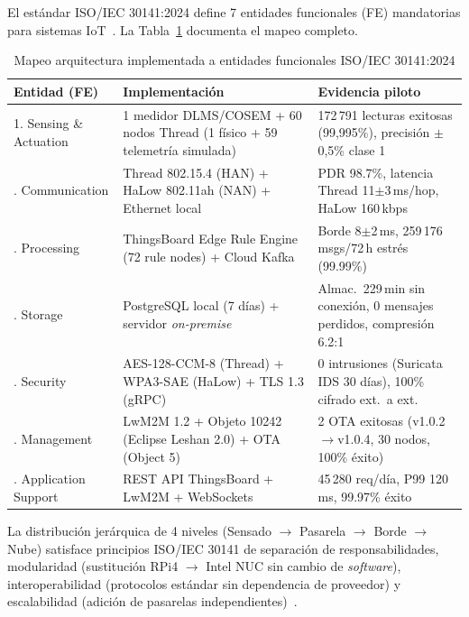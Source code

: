 El estándar ISO/IEC 30141:2024 define 7 entidades funcionales (FE) mandatorias para sistemas IoT~\cite{ISOIEC30141v2024,tangResearchInteroperabilityIoT}. La Tabla~\ref{tab:conformidad-iso30141} documenta el mapeo completo.

\begin{table}[H]
\centering
\caption{Mapeo arquitectura implementada a entidades funcionales ISO/IEC 30141:2024}
\label{tab:conformidad-iso30141}
\small
\begin{tabular}{@{}p{2.2cm}p{4.8cm}p{6.0cm}@{}}
\toprule
\textbf{Entidad (FE)} & \textbf{Implementación} & \textbf{Evidencia piloto} \\
\midrule
1. Sensing \& Actuation & 1 medidor DLMS/COSEM + 60 nodos Thread (1 físico + 59 telemetría simulada) & 172\,791 lecturas exitosas (99,995\%), precisión $\pm$0,5\% clase 1 \\
\addlinespace
2. Communication & Thread 802.15.4 (HAN) + HaLow 802.11ah (NAN) + Ethernet local~\cite{ThreadGroup1-4-0,IEEE802154-2020} & PDR 98.7\%, latencia Thread 11$\pm$3\,ms/hop, HaLow 160\,kbps \\
\addlinespace
3. Processing & ThingsBoard Edge Rule Engine (72 rule nodes) + Cloud Kafka & Borde 8$\pm$2\,ms, 259\,176 msgs/72\,h estrés (99.99\%) \\
\addlinespace
4. Storage & PostgreSQL local (7 días) + servidor \emph{on-premise} & Almac.\ 229\,min sin conexión, 0 mensajes perdidos, compresión 6.2:1 \\
\addlinespace
5. Security & AES-128-CCM-8 (Thread) + WPA3-SAE (HaLow) + TLS 1.3 (gRPC) & 0 intrusiones (Suricata IDS 30 días), 100\% cifrado ext.\ a ext.\ \\
\addlinespace
6. Management & LwM2M 1.2 + Objeto 10242 (Eclipse Leshan 2.0) + OTA (Object 5) & 2 OTA exitosas (v1.0.2$\rightarrow$v1.0.4, 30 nodos, 100\% éxito) \\
\addlinespace
7. Application Support & REST API ThingsBoard + LwM2M + WebSockets & 45\,280 req/día, P99 120\,ms, 99.97\% éxito \\
\bottomrule
\end{tabular}
\end{table}

La distribución jerárquica de 4 niveles (Sensado $\rightarrow$ Pasarela $\rightarrow$ Borde $\rightarrow$ Nube) satisface principios ISO/IEC 30141 de separación de responsabilidades, modularidad (sustitución RPi4 $\rightarrow$ Intel NUC sin cambio de \emph{software}), interoperabilidad (protocolos estándar sin dependencia de proveedor) y escalabilidad (adición de pasarelas independientes)~\cite{thingsboardCloudArchitecture2024}.



